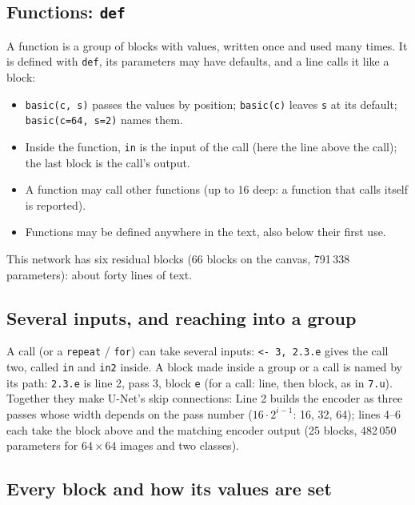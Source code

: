 \subsection{Functions: \texttt{def}}
A function is a group of blocks with values, written once and used many times. It is defined with \texttt{def}, its parameters may have
defaults, and a line calls it like a block:
\begin{itemize}[nosep]
  \item \texttt{basic(c, s)} passes the values by position; \texttt{basic(c)} leaves \texttt{s} at its default; \texttt{basic(c=64, s=2)}
        names them.
  \item Inside the function, \texttt{in} is the input of the call (here the line above the call); the last block is the call's output.
  \item A function may call other functions (up to 16 deep: a function that calls itself is reported).
  \item Functions may be defined anywhere in the text, also below their first use.
\end{itemize}
This network has six residual blocks (66 blocks on the canvas, 791\,338 parameters): about forty lines of text.

\subsection{Several inputs, and reaching into a group}
A call (or a \texttt{repeat} / \texttt{for}) can take several inputs: \texttt{<- 3, 2.3.e} gives the call two, called \texttt{in} and
\texttt{in2} inside. A block made inside a group or a call is named by its path: \texttt{2.3.e} is line 2, pass 3, block \texttt{e} (for a
call: line, then block, as in \texttt{7.u}). Together they make U-Net's skip connections:
Line 2 builds the encoder as three passes whose width depends on the pass number ($16\cdot2^{i-1}$: 16, 32, 64); lines 4--6 each take
the block above and the matching encoder output (25 blocks, 482\,050 parameters for $64\times64$ images and two classes).

\subsection{Every block and how its values are set}
\label{sec:blocks-text}
